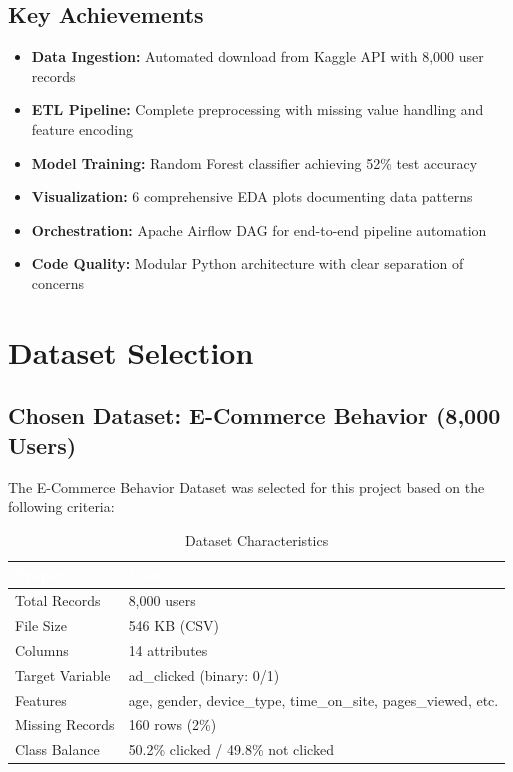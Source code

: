 \documentclass[11pt,a4paper]{article}
\begin{document}
\subsection{Key Achievements}

\begin{itemize}[leftmargin=1.5em, itemsep=3pt]
  \item \textbf{Data Ingestion:} Automated download from Kaggle API with 8,000 user records
  \item \textbf{ETL Pipeline:} Complete preprocessing with missing value handling and feature encoding
  \item \textbf{Model Training:} Random Forest classifier achieving 52\% test accuracy
  \item \textbf{Visualization:} 6 comprehensive EDA plots documenting data patterns
  \item \textbf{Orchestration:} Apache Airflow DAG for end-to-end pipeline automation
  \item \textbf{Code Quality:} Modular Python architecture with clear separation of concerns
\end{itemize}

\section{Dataset Selection}

\subsection{Chosen Dataset: E-Commerce Behavior (8,000 Users)}

The E-Commerce Behavior Dataset was selected for this project based on the following criteria:

\begin{table}[H]
\centering
\caption{Dataset Characteristics}
\small
\begin{tabular}{L{3.5cm} L{5.5cm}}
\toprule
{}
\textcolor{white}{\textbf{Property}} &
\textcolor{white}{\textbf{Value}} \\
\midrule
Total Records & 8,000 users \\
File Size & 546 KB (CSV) \\
Columns & 14 attributes \\
Target Variable & ad\_clicked (binary: 0/1) \\
Features & age, gender, device\_type, time\_on\_site, pages\_viewed, etc. \\
Missing Records & 160 rows (2\%) \\
Class Balance & 50.2\% clicked / 49.8\% not clicked \\
\bottomrule
\end{tabular}
\end{table}
\end{document}
